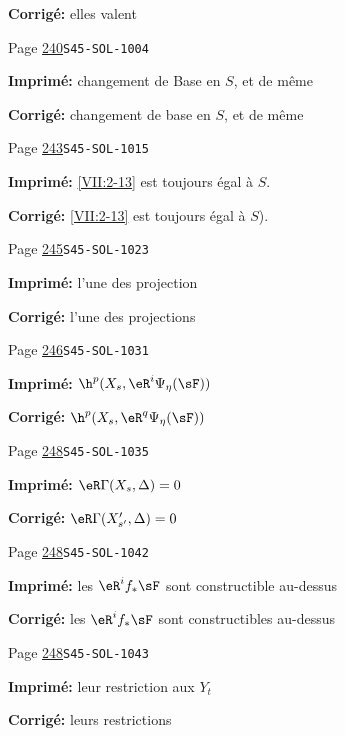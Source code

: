 \begin{description}
\par\noindent\textbf{Corrigé:} elles valent
\smallskip
\item[\hypertarget{apparatus:FR-0254}{254}] Page \hyperlink{printpage:fr:240}{240}\quad\texttt{S45-SOL-1004}
\par\noindent\textbf{Imprimé:} changement de Base en $S$, et de même
\par\noindent\textbf{Corrigé:} changement de base en $S$, et de même
\smallskip
\item[\hypertarget{apparatus:FR-0255}{255}] Page \hyperlink{printpage:fr:243}{243}\quad\texttt{S45-SOL-1015}
\par\noindent\textbf{Imprimé:} \ref{VII:2-13} est toujours égal à $S$.
\par\noindent\textbf{Corrigé:} \ref{VII:2-13} est toujours égal à $S$).
\smallskip
\item[\hypertarget{apparatus:FR-0256}{256}] Page \hyperlink{printpage:fr:245}{245}\quad\texttt{S45-SOL-1023}
\par\noindent\textbf{Imprimé:} l'une des projection 
\par\noindent\textbf{Corrigé:} l'une des projections 
\smallskip
\item[\hypertarget{apparatus:FR-0257}{257}] Page \hyperlink{printpage:fr:246}{246}\quad\texttt{S45-SOL-1031}
\par\noindent\textbf{Imprimé:} \(\h^p(X_s,\eR^i\Psi_\eta(\sF))\)
\par\noindent\textbf{Corrigé:} \(\h^p(X_s,\eR^q\Psi_\eta(\sF))\)
\smallskip
\item[\hypertarget{apparatus:FR-0258}{258}] Page \hyperlink{printpage:fr:248}{248}\quad\texttt{S45-SOL-1035}
\par\noindent\textbf{Imprimé:} $\eR\Gamma(X_s,\Delta)=0$
\par\noindent\textbf{Corrigé:} $\eR\Gamma(X_{s'}',\Delta)=0$
\smallskip
\item[\hypertarget{apparatus:FR-0259}{259}] Page \hyperlink{printpage:fr:248}{248}\quad\texttt{S45-SOL-1042}
\par\noindent\textbf{Imprimé:} les $\eR^i f_\ast \sF$ sont constructible au-dessus
\par\noindent\textbf{Corrigé:} les $\eR^i f_\ast \sF$ sont constructibles au-dessus
\smallskip
\item[\hypertarget{apparatus:FR-0260}{260}] Page \hyperlink{printpage:fr:248}{248}\quad\texttt{S45-SOL-1043}
\par\noindent\textbf{Imprimé:} leur restriction 
aux $Y_t$
\par\noindent\textbf{Corrigé:} leurs restrictions 

\end{description}
